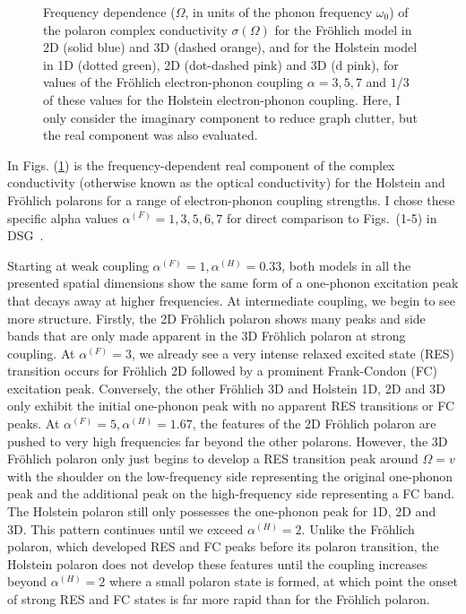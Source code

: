 \begin{figure}[!tbp]
    \caption{Frequency dependence ($\Omega$, in units of the phonon frequency $\omega_0$) of the polaron complex conductivity $\sigma(\Omega)$ for the Fr\"ohlich model in 2D (solid blue) and 3D (dashed orange), and for the Holstein model in 1D (dotted green), 2D (dot-dashed pink) and 3D (d pink), for values of the Fr\"ohlich electron-phonon coupling $\alpha = 3, 5, 7$ and $1/3$ of these values for the Holstein electron-phonon coupling. Here, I only consider the imaginary component to reduce graph clutter, but the real component was also evaluated.}
    \label{fig:re_con_freq}
\end{figure}
In Figs. (\ref{fig:re_con_freq}) is the frequency-dependent real component of the complex conductivity (otherwise known as the optical conductivity) for the Holstein and Fr\"ohlich polarons for a range of electron-phonon coupling strengths. I chose these specific alpha values $\alpha^{(F)} = 1, 3, 5, 6, 7$ for direct comparison to Figs.~(1-5) in DSG~\cite{devreese_optical_1972}.

Starting at weak coupling $\alpha^{(F)} = 1, \alpha^{(H)} = 0.33$, both models in all the presented spatial dimensions show the same form of a one-phonon excitation peak that decays away at higher frequencies. At intermediate coupling, we begin to see more structure. Firstly, the 2D Fr\"ohlich polaron shows many peaks and side bands that are only made apparent in the 3D Fr\"ohlich polaron at strong coupling. At $\alpha^{(F)} = 3$, we already see a very intense relaxed excited state (RES) transition occurs for Fr\"ohlich 2D followed by a prominent Frank-Condon (FC) excitation peak. Conversely, the other Fr\"ohlich 3D and Holstein 1D, 2D and 3D only exhibit the initial one-phonon peak with no apparent RES transitions or FC peaks. At $\alpha^{(F)} = 5, \alpha^{(H)} = 1.67$, the features of the 2D Fr\"ohlich polaron are pushed to very high frequencies far beyond the other polarons. However, the 3D Fr\"ohlich polaron only just begins to develop a RES transition peak around $\Omega = v$ with the shoulder on the low-frequency side representing the original one-phonon peak and the additional peak on the high-frequency side representing a FC band. The Holstein polaron still only possesses the one-phonon peak for 1D, 2D and 3D. This pattern continues until we exceed $\alpha^{(H)} = 2$. Unlike the Fr\"ohlich polaron, which developed RES and FC peaks before its polaron transition, the Holstein polaron does not develop these features until the coupling increases beyond $\alpha^{(H)} = 2$ where a small polaron state is formed, at which point the onset of strong RES and FC states is far more rapid than for the Fr\"ohlich polaron. 

